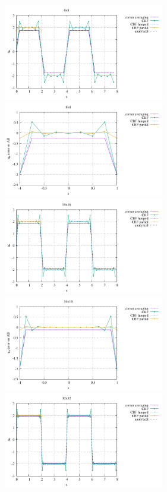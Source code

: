 \begin{center}
\includegraphics[width=7cm]{python_codes/fieldstone_173/results/exp3/heat_flux_boundary_8.pdf}
\includegraphics[width=7cm]{python_codes/fieldstone_173/results/exp3/heat_flux_boundary_bottom_8.pdf}\\
\includegraphics[width=7cm]{python_codes/fieldstone_173/results/exp3/heat_flux_boundary_16.pdf}
\includegraphics[width=7cm]{python_codes/fieldstone_173/results/exp3/heat_flux_boundary_bottom_16.pdf}\\
\includegraphics[width=7cm]{python_codes/fieldstone_173/results/exp3/heat_flux_boundary_32.pdf}

\end{center}
